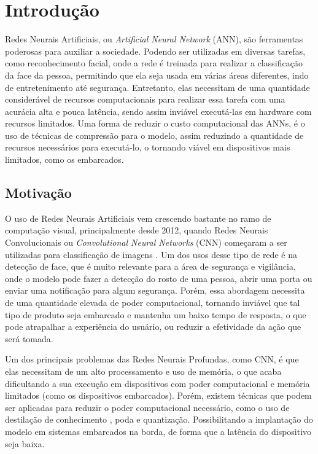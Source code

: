 \chapter{Introdução}

Redes Neurais Artificiais, ou \textit{Artificial Neural Network} (ANN), são ferramentas poderosas para auxiliar a
sociedade.
Podendo ser utilizadas em diversas tarefas, como reconhecimento facial, onde a rede é treinada para realizar a
classificação da face da pessoa, permitindo que ela seja usada em várias áreas diferentes, indo de entretenimento até
segurança. Entretanto, elas necessitam de uma quantidade considerável de recursos computacionais para realizar essa tarefa
com uma acurácia alta e pouca latência, sendo assim inviável executá-las em hardware com recursos limitados.
Uma forma de reduzir o custo computacional das ANNs, é o uso de técnicas de compressão para o modelo, assim reduzindo a
quantidade de recursos necessários para executá-lo, o tornando viável em dispositivos mais limitados, como os embarcados.



\section{Motivação}
O uso de Redes Neurais Artificiais vem crescendo bastante no ramo de computação visual, principalmente desde 2012,
quando Redes Neurais Convolucionais ou \textit{Convolutional Neural Networks} (CNN) começaram a ser utilizadas para
classificação de imagens \cite{alexnet}.
Um dos usos desse tipo de rede é na detecção de face, que é muito relevante para a área de segurança e
vigilância, onde o modelo pode fazer a detecção do rosto de uma pessoa, abrir uma porta ou enviar uma notificação
para algum segurança.
Porém, essa abordagem necessita de uma quantidade elevada de poder computacional, tornando inviável que tal tipo de
produto seja embarcado e mantenha um baixo tempo de resposta, o que pode atrapalhar a experiência do usuário, ou
reduzir a efetividade da ação que será tomada.

Um dos principais problemas das Redes Neurais Profundas, como CNN, é que elas necessitam de um alto processamento e uso
de memória, o que acaba dificultando a sua execução em dispositivos com poder computacional e memória limitados (como os dispositivos embarcados).
Porém, existem técnicas que podem ser aplicadas para reduzir o poder computacional necessário, como o uso de
destilação de conhecimento \cite{hinton2015distilling}, poda e quantização.
Possibilitando a implantação do modelo em sistemas embarcados na borda, de forma que a latência do dispositivo seja
baixa.

